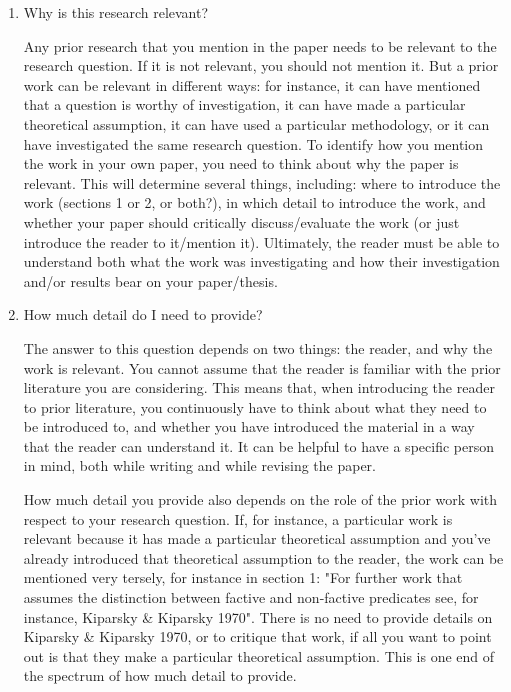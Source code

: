 \documentclass[11pt,fleqn,a4paper/thesis]{article}
\newcommand{\6}{\mbox{$[\hspace*{-.6mm}[$}}
\newcommand{\9}{\mbox{$]\hspace*{-.6mm}]$}}
\begin{document}
\begin{itemize}[itemsep=-1pt,leftmargin=2.5ex,topsep=-2pt]
\begin{enumerate}
\item Why is this research relevant?

Any prior research that you mention in the paper needs to be relevant to the research question. If it is not relevant, you should not mention it. But a prior work can be relevant in different ways: for instance, it can have mentioned that a question is worthy of investigation, it can have made a particular theoretical assumption, it can have used a particular methodology, or it can have investigated the same research question. To identify how you mention the work in your own paper, you need to think about why the paper is relevant. This will determine several things, including: where to introduce the work (sections 1 or 2, or both?), in which detail to introduce the work, and whether your paper should critically discuss/evaluate the work (or just introduce the reader to it/mention it). Ultimately, the reader must be able to understand both what the work was investigating and how their investigation and/or results bear on your paper/thesis.

\item How much detail do I need to provide?

The answer to this question depends on two things: the reader, and why the work is relevant. You cannot assume that the reader is familiar with the prior literature you are considering. This means that, when introducing the reader to prior literature, you continuously have to think about what they need to be introduced to, and whether you have introduced the material in a way that the reader can understand it. It can be helpful to have a specific person in mind, both while writing and while revising the paper. 

How much detail you provide also depends on the role of the prior work with respect to your research question. If, for instance, a particular work is relevant because it has made a particular theoretical assumption and you've already introduced that theoretical assumption to the reader, the work can be mentioned very tersely, for instance in section 1: "For further work that assumes the distinction between factive and non-factive predicates see, for instance, Kiparsky \& Kiparsky 1970". There is no need to provide details on Kiparsky \& Kiparsky 1970, or to critique that work, if all you want to point out is that they make a particular theoretical assumption. This is one end of the spectrum of how much detail to provide. 


\end{enumerate}
\end{itemize}
\end{document}
